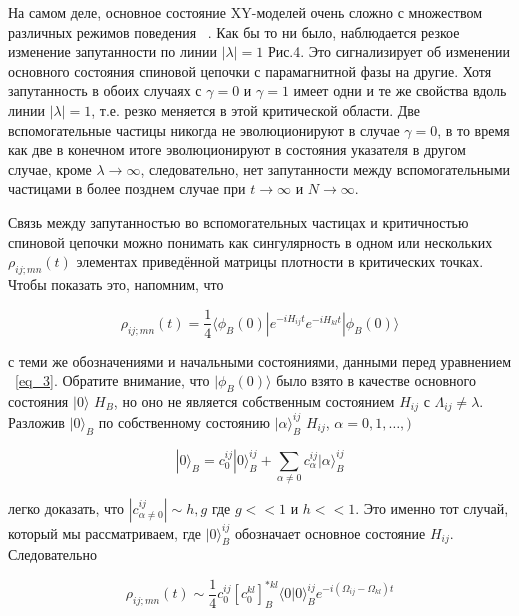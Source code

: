 \documentclass[11pt]{article}
\begin{document}
На самом деле, основное состояние XY-моделей очень сложно с множеством различных режимов поведения ~\cite{b24,b25}. Как бы то ни было, наблюдается резкое изменение запутанности по линии $|\lambda |= 1$ Рис.4. Это сигнализирует об изменении основного состояния спиновой цепочки с парамагнитной фазы на другие.
Хотя запутанность в обоих случаях с $\gamma = 0$ и $\gamma = 1$ имеет одни и те же свойства вдоль линии $|\lambda|= 1$, т.е. резко меняется в этой критической области. Две вспомогательные частицы никогда не эволюционируют в случае $\gamma = 0$, в то время как две в конечном итоге эволюционируют в состояния указателя в другом случае, кроме $\lambda → \infty$, следовательно, нет запутанности между вспомогательными частицами в более позднем случае при $ t → \infty $ и $ N → \infty$.

Связь между запутанностью во вспомогательных частицах и критичностью спиновой цепочки можно понимать как сингулярность в одном или нескольких $\rho_{ij;mn}(t)$ элементах приведённой матрицы плотности в критических точках. Чтобы показать это, напомним, что

\begin{equation}
\rho_{ij;mn}(t)=\frac{1}{4}\langle\phi_B(0)|e^{-iH_{ij}t}e^{-iH_{kl}t}|\phi_B(0)\rangle
\label{eq_6}
\end{equation}

с теми же обозначениями и начальными состояниями, данными перед уравнением ~\ref{eq_3}. Обратите внимание, что $|\phi_B(0)\rangle$ было взято в качестве основного состояния $|0\rangle$ $H_B$, но оно не является собственным состоянием $H_{ij}$ с $\Lambda_{ij} \ne \lambda$. Разложив $|0\rangle_B$ по собственному состоянию $|\alpha\rangle_B^{ij}$  $H_{ij}$, $\alpha = 0,1,\dots,)$


\begin{equation}
|0\rangle_B=c_0^{ij}|0\rangle_B^{ij} + \sum\limits_{\alpha \ne 0} c_{\alpha}^{ij}|\alpha \rangle_B^{ij}
\label{eq_7}
\end{equation}

легко доказать, что 
$|c_{\alpha \ne 0}^{ij}| \sim h,g$
где $g << 1$ и $h << 1$. Это именно тот случай, который мы рассматриваем, где $|0\rangle_B^{ij}$ обозначает основное состояние $H_{ij}$. Следовательно

\begin{equation}
\rho_{ij;mn}(t) \sim \frac{1}{4}c_0^{ij}[c_0^{kl}]_B^{*kl}
\langle 0|0 \rangle_B^{ij}e^{-i(\Omega_{ij}-\Omega_{kl})t}
\label{eq_8}
\end{equation}
\end{document}
